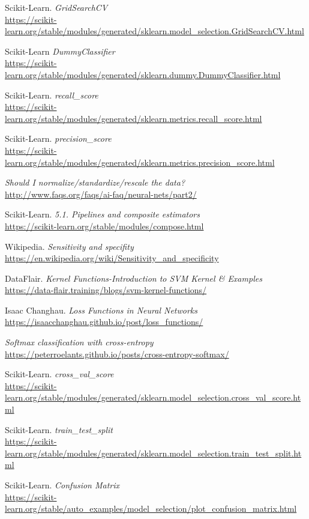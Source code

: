 \documentclass[11pt,a4paper]{article}
\begin{document}
\begin{thebibliography}{25}
Scikit-Learn. \textit{GridSearchCV}
\\\url{https://scikit-learn.org/stable/modules/generated/sklearn.model_selection.GridSearchCV.html}

Scikit-Learn \textit{DummyClassifier}
\\\url{https://scikit-learn.org/stable/modules/generated/sklearn.dummy.DummyClassifier.html}

Scikit-Learn. \textit{recall\_score}
\\\url{https://scikit-learn.org/stable/modules/generated/sklearn.metrics.recall_score.html}

Scikit-Learn. \textit{precision\_score}
\\\url{https://scikit-learn.org/stable/modules/generated/sklearn.metrics.precision_score.html}

\textit{Should I normalize/standardize/rescale the data?}
\\\url{http://www.faqs.org/faqs/ai-faq/neural-nets/part2/}

Scikit-Learn. \textit{5.1. Pipelines and composite estimators}
\\\url{https://scikit-learn.org/stable/modules/compose.html}

Wikipedia. \textit{Sensitivity and specifity}
\\\url{https://en.wikipedia.org/wiki/Sensitivity_and_specificity}

DataFlair. \textit{Kernel Functions-Introduction to SVM Kernel & Examples}
\\\url{https://data-flair.training/blogs/svm-kernel-functions/}

Isaac Changhau. \textit{Loss Functions in Neural Networks}
\\\url{https://isaacchanghau.github.io/post/loss_functions/}

\textit{Softmax classification with cross-entropy}
\\\url{https://peterroelants.github.io/posts/cross-entropy-softmax/}

Scikit-Learn. \textit{cross\_val\_score}
\\\url{https://scikit-learn.org/stable/modules/generated/sklearn.model_selection.cross_val_score.html}

Scikit-Learn. \textit{train\_test\_split}
\\\url{https://scikit-learn.org/stable/modules/generated/sklearn.model_selection.train_test_split.html}

Scikit-Learn. \textit{Confusion Matrix}
\\\url{https://scikit-learn.org/stable/auto_examples/model_selection/plot_confusion_matrix.html}

\end{thebibliography}
\end{document}
